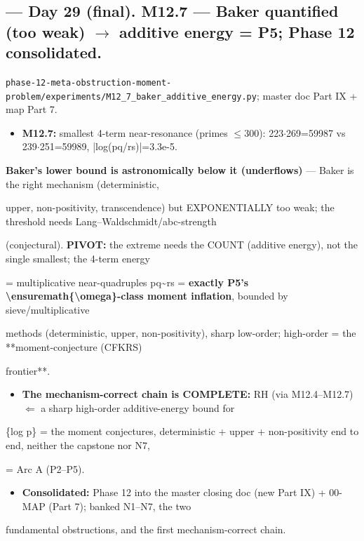 \documentclass[10pt]{article}
\begin{document}
\subsection*{ --- Day 29 (final). M12.7 --- Baker quantified (too weak) \ensuremath{\to} additive energy = P5; Phase 12 consolidated.}
\texttt{phase-12-meta-obstruction-moment-problem/experiments/M12\_7\_baker\_additive\_energy.py}; master doc Part IX + map Part 7.\par
\begin{itemize}
\item \textbf{M12.7:} smallest 4-term near-resonance (primes \ensuremath{\le}300): 223\ensuremath{\cdot}269=59987 vs 239\ensuremath{\cdot}251=59989, |log(pq/rs)|=3.3e-5.
\end{itemize}
  \textbf{Baker's lower bound is astronomically below it (underflows)} --- Baker is the right mechanism (deterministic,\par
  upper, non-positivity, transcendence) but EXPONENTIALLY too weak; the threshold needs Lang--Waldschmidt/abc-strength\par
  (conjectural). \textbf{PIVOT:} the extreme needs the COUNT (additive energy), not the single smallest; the 4-term energy\par
  = multiplicative near-quadruples pq\textasciitilde{}rs = \textbf{exactly P5's \textbackslash{}ensuremath\{\textbackslash{}omega\}-class moment inflation}, bounded by sieve/multiplicative\par
  methods (deterministic, upper, non-positivity), sharp low-order; high-order = the **moment-conjecture (CFKRS)\par
  frontier**.\par
\begin{itemize}
\item \textbf{The mechanism-correct chain is COMPLETE:} RH (via M12.4--M12.7) \ensuremath{\Leftarrow} a sharp high-order additive-energy bound for
\end{itemize}
  \{log p\} = the moment conjectures, deterministic + upper + non-positivity end to end, neither the capstone nor N7,\par
  = Arc A (P2--P5).\par
\begin{itemize}
\item \textbf{Consolidated:} Phase 12 into the master closing doc (new Part IX) + 00-MAP (Part 7); banked N1--N7, the two
\end{itemize}
  fundamental obstructions, and the first mechanism-correct chain.\par
\end{document}
